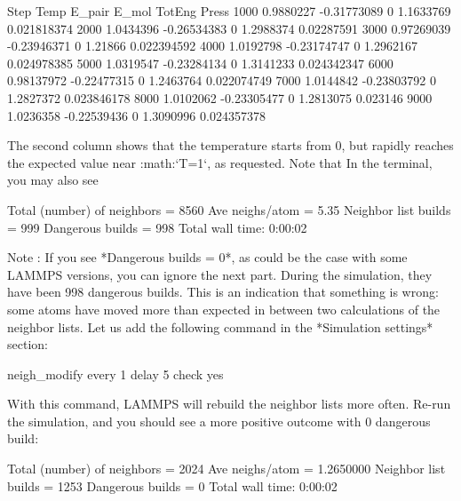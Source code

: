 \begin{lcverbatim}
Step         Temp       E_pair        E_mol       TotEng        Press
1000    0.9880227  -0.31773089            0    1.1633769  0.021818374 
2000    1.0434396  -0.26534383            0    1.2988374   0.02287591 
3000   0.97269039  -0.23946371            0      1.21866  0.022394592 
4000    1.0192798  -0.23174747            0    1.2962167  0.024978385 
5000    1.0319547  -0.23284134            0    1.3141233  0.024342347 
6000   0.98137972  -0.22477315            0    1.2463764  0.022074749 
7000    1.0144842  -0.23803792            0    1.2827372  0.023846178 
8000    1.0102062  -0.23305477            0    1.2813075     0.023146 
9000    1.0236358  -0.22539436            0    1.3090996  0.024357378 
\end{lcverbatim}

The second column shows that the temperature
starts from 0, but rapidly reaches the
expected value near :math:`T=1`, as requested. 
Note that  In the terminal, you may also see



\begin{lcverbatim}
Total (number) of neighbors = 8560
Ave neighs/atom = 5.35
Neighbor list builds = 999
Dangerous builds = 998
Total wall time: 0:00:02
\end{lcverbatim}

Note : If you see *Dangerous builds = 0*, as could be
the case with some LAMMPS versions, you can ignore
the next part.
During the simulation, they have been 998 dangerous builds.
This is an indication that something is wrong: some atoms
have moved more than expected in between two calculations of
the neighbor lists. Let us add the following command in the
*Simulation settings* section:



\begin{lcverbatim}
neigh_modify every 1 delay 5 check yes
\end{lcverbatim}

With this command, LAMMPS will rebuild the neighbor lists
more often. Re-run the simulation, and you should see a more
positive outcome with 0 dangerous build:



\begin{lcverbatim}
Total (number) of neighbors = 2024
Ave neighs/atom = 1.2650000
Neighbor list builds = 1253
Dangerous builds = 0
Total wall time: 0:00:02
\end{lcverbatim}

